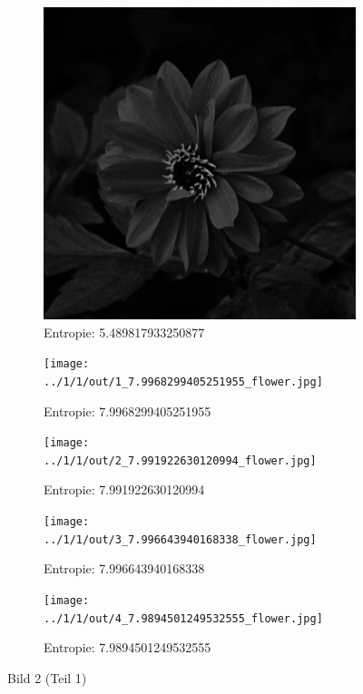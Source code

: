 \begin{figure}
	\centering

	\begin{subfigure}{0.25\textwidth}
		\includegraphics[width=\textwidth]{../1/3/gray_5.489817933250877_flower.jpg}
		\caption{Entropie: 5.489817933250877}
	\end{subfigure}

	\begin{subfigure}{0.25\textwidth}
		\texttt{[image: ../1/1/out/1\_7.9968299405251955\_flower.jpg]}
		\caption{Entropie: 7.9968299405251955}
	\end{subfigure}

	\begin{subfigure}{0.25\textwidth}
		\texttt{[image: ../1/1/out/2\_7.991922630120994\_flower.jpg]}
		\caption{Entropie: 7.991922630120994}
	\end{subfigure}

	\begin{subfigure}{0.25\textwidth}
		\texttt{[image: ../1/1/out/3\_7.996643940168338\_flower.jpg]}
		\caption{Entropie: 7.996643940168338}
	\end{subfigure}

	\begin{subfigure}{0.25\textwidth}
		\texttt{[image: ../1/1/out/4\_7.9894501249532555\_flower.jpg]}
		\caption{Entropie: 7.9894501249532555}
	\end{subfigure}
	\caption{Bild 2 (Teil 1)}
\end{figure}
